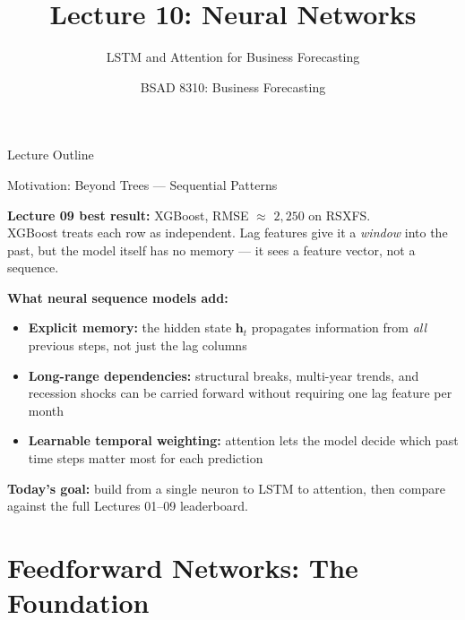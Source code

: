 \documentclass[aspectratio=169, 10pt]{beamer}
\title{Lecture 10: Neural Networks}
\subtitle{LSTM and Attention for Business Forecasting}
\author{BSAD 8310: Business Forecasting}
\institute{University of Nebraska at Omaha}
\begin{document}

\begin{frame}
  \titlepage
\end{frame}

\begin{frame}{Lecture Outline}
  \tableofcontents
\end{frame}

\begin{frame}{Motivation: Beyond Trees --- Sequential Patterns}
  \begin{keybox}
    \textbf{Lecture 09 best result:} XGBoost, RMSE $\approx$ $2{,}250$ on RSXFS.\\[4pt]
    XGBoost treats each row as independent.
    Lag features give it a \emph{window} into the past, but the model itself
    has no memory --- it sees a feature vector, not a sequence.
  \end{keybox}

  \medskip
  \textbf{What neural sequence models add:}
  \begin{itemize}
    \item \textbf{Explicit memory:} the hidden state $\mathbf{h}_t$ propagates
          information from \emph{all} previous steps, not just the lag columns
    \item \textbf{Long-range dependencies:} structural breaks, multi-year
          trends, and recession shocks can be carried forward without
          requiring one lag feature per month
    \item \textbf{Learnable temporal weighting:} attention lets the model
          decide which past time steps matter most for each prediction
  \end{itemize}

  \medskip
  \textbf{Today's goal:} build from a single neuron to LSTM to attention,
  then compare against the full Lectures 01--09 leaderboard.
\end{frame}

\section{Feedforward Networks: The Foundation}
\end{document}

